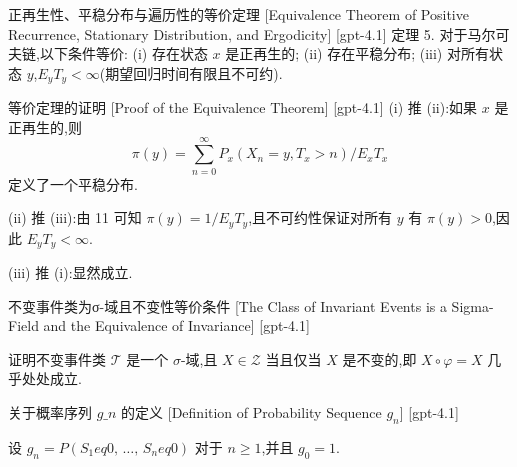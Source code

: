 \documentclass[UTF8]{ctexart}
\begin{document}
    
    
    \begin{thm}
        {正再生性、平稳分布与遍历性的等价定理}
        [Equivalence Theorem of Positive Recurrence, Stationary Distribution, and Ergodicity]
        [gpt-4.1]
        定理 5. 对于马尔可夫链,以下条件等价:
(i) 存在状态 $x$ 是正再生的;
(ii) 存在平稳分布;
(iii) 对所有状态 $y$,$E _ { y } T _ { y } < \infty$(期望回归时间有限且不可约).

    \end{thm}
    
    
    
    \begin{prf}
        {等价定理的证明}
        [Proof of the Equivalence Theorem]
        [gpt-4.1]
        (i) 推 (ii):如果 $x$ 是正再生的,则
\[
\pi ( y ) = \sum _ { n = 0 } ^ { \infty } P _ { x } ( X _ { n } = y , T _ { x } > n ) / E _ { x } T _ { x }
\]
定义了一个平稳分布.

(ii) 推 (iii):由 11 可知 $\pi ( y ) = 1 / E _ { y } T _ { y }$,且不可约性保证对所有 $y$ 有 $\pi ( y ) > 0$,因此 $E _ { y } T _ { y } < \infty$.

(iii) 推 (i):显然成立.

    \end{prf}
    
    
    
    \begin{thm}
        {不变事件类为σ-域且不变性等价条件}
        [The Class of Invariant Events is a Sigma-Field and the Equivalence of Invariance]
        [gpt-4.1]
        
证明不变事件类 $\mathcal{T}$ 是一个 $\sigma$-域,且 $X \in \mathcal{Z}$ 当且仅当 $X$ 是不变的,即 $X \circ \varphi = X$ 几乎处处成立.

    \end{thm}
    
    
    
    \begin{dfn}
        {关于概率序列 $g\_n$ 的定义}
        [Definition of Probability Sequence $g_n$]
        [gpt-4.1]
        
设 $g_{n} = P(S_{1} 
eq 0,\, \ldots,\, S_{n} 
eq 0)$ 对于 $n \geq 1$,并且 $g_{0} = 1$.

    \end{dfn}
    
\end{document}
